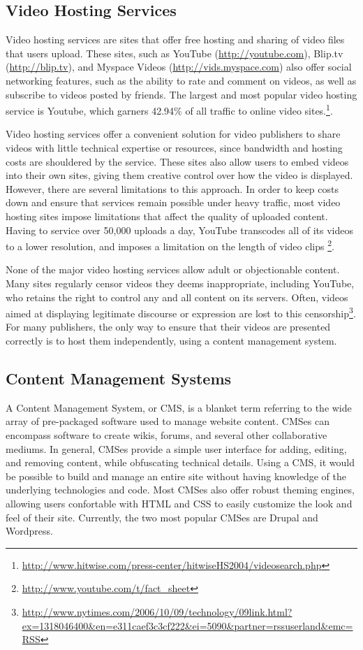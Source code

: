 \documentclass[a4paper,12pt]{report}
\begin{document}
\subsection{Video Hosting Services}
Video hosting services are sites that offer free hosting and sharing of video files that users upload.
These sites, such as YouTube (\url{http://youtube.com}), Blip.tv (\url{http://blip.tv}), and Myspace Videos (\url{http://vids.myspace.com}) also offer social networking features, such as the ability to rate and comment on videos, as well as subscribe to videos posted by friends.
The largest and most popular video hosting service is Youtube, which garners 42.94\% of all traffic to online video sites.\footnote{\url{http://www.hitwise.com/press-center/hitwiseHS2004/videosearch.php}}. 

Video hosting services offer a convenient solution for video publishers 
to share videos with little technical expertise or resources, since bandwidth and hosting costs are shouldered by the service. These sites also allow users to embed videos into their own sites, giving them creative control over how the video is displayed. However, there are several limitations to this approach. In order to keep costs down and ensure that services remain possible under heavy traffic, most video hosting sites impose limitations that affect the quality of uploaded content. Having to service over 50,000 uploads a day, YouTube transcodes all of its videos to a lower resolution, and imposes a limitation on the length of video clips \footnote{\url{http://www.youtube.com/t/fact\_sheet}}. 

None of the major video hosting services allow adult or objectionable content.
Many sites regularly censor videos they deems inappropriate, including YouTube, who retains the right to control any and all content on its servers.
Often, videos aimed at displaying legitimate discourse or expression are lost to this censorship\footnote{\url{http://www.nytimes.com/2006/10/09/technology/09link.html?ex=1318046400&en=e311caef3c3cf222&ei=5090&partner=rssuserland&emc=RSS}}.
For many publishers, the only way to ensure that their videos are presented correctly is to host them independently, using a content management system.

\subsection{Content Management Systems}

A Content Management System, or CMS, is a blanket term referring to the wide array of pre-packaged software used to manage website content. CMSes can encompass software to create wikis, forums, and several other collaborative mediums. In general, CMSes provide a simple user interface for adding, editing, and removing content, while obfuscating technical details. Using a CMS, it would be possible to build and manage an entire site without having knowledge of the underlying technologies and code. Most CMSes also offer robust theming engines, allowing users confortable with HTML and CSS to easily customize the look and feel of their site. Currently, the two most popular CMSes are Drupal and Wordpress.
\end{document}
